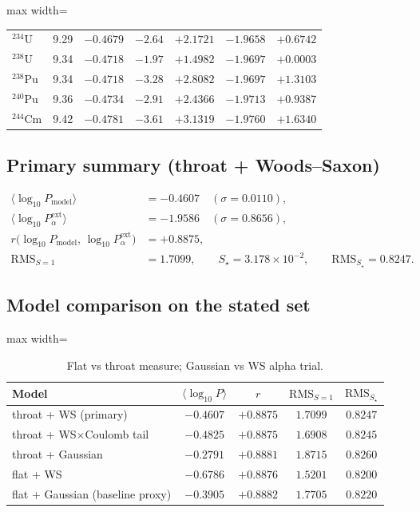 \documentclass[11pt,a4paper]{article}
\theoremstyle{remark}
\begin{document}
\begin{table}[H]
\begin{adjustbox}{max width=\linewidth}
\begin{tabular}{lcccccc}
$^{234}\mathrm{U}$  & 9.29 & $-0.4679$ & $-2.64$ & $+2.1721$ & $-1.9658$ & $+0.6742$ \\
$^{238}\mathrm{U}$  & 9.34 & $-0.4718$ & $-1.97$ & $+1.4982$ & $-1.9697$ & $+0.0003$ \\
$^{238}\mathrm{Pu}$ & 9.34 & $-0.4718$ & $-3.28$ & $+2.8082$ & $-1.9697$ & $+1.3103$ \\
$^{240}\mathrm{Pu}$ & 9.36 & $-0.4734$ & $-2.91$ & $+2.4366$ & $-1.9713$ & $+0.9387$ \\
$^{244}\mathrm{Cm}$ & 9.42 & $-0.4781$ & $-3.61$ & $+3.1319$ & $-1.9760$ & $+1.6340$ \\
\bottomrule
\end{tabular}\end{adjustbox}
\end{table}

\subsection{Primary summary (throat + Woods--Saxon)}
\begin{align*}
\langle\log_{10} P_{\mathrm{model}}\rangle &= -0.4607
\quad(\sigma=0.0110),\\
\langle\log_{10} P_\alpha^{\mathrm{ext}}\rangle &= -1.9586
\quad(\sigma=0.8656),\\
r\bigl(\log_{10} P_{\mathrm{model}},\,\log_{10} P_\alpha^{\mathrm{ext}}\bigr)
&= +0.8875,\\
\mathrm{RMS}_{S=1} &= 1.7099,\qquad
S_{\star}=3.178\times 10^{-2},\qquad
\mathrm{RMS}_{S_\star}=0.8247.
\end{align*}

\subsection{Model comparison on the stated set}
\begin{table}[H]
\centering
\caption{Flat vs throat measure; Gaussian vs WS alpha trial.}
\label{tab:model-compare}
\scriptsize
\renewcommand{\arraystretch}{0.8}
\begin{adjustbox}{max width=\linewidth}\begin{tabular}{lcccc}
\toprule
\textbf{Model} & $\langle\log_{10} P\rangle$ & $r$ & $\mathrm{RMS}_{S=1}$ & $\mathrm{RMS}_{S_\star}$ \\
\midrule
throat + WS (primary) & $-0.4607$ & $+0.8875$ & $1.7099$ & $0.8247$ \\
throat + WS$\times$Coulomb tail & $-0.4825$ & $+0.8875$ & $1.6908$ & $0.8245$ \\
throat + Gaussian & $-0.2791$ & $+0.8881$ & $1.8715$ & $0.8260$ \\
flat + WS & $-0.6786$ & $+0.8876$ & $1.5201$ & $0.8200$ \\
flat + Gaussian (baseline proxy) & $-0.3905$ & $+0.8882$ & $1.7705$ & $0.8220$ \\
\bottomrule
\end{tabular}\end{adjustbox}
\end{table}
\end{document}
